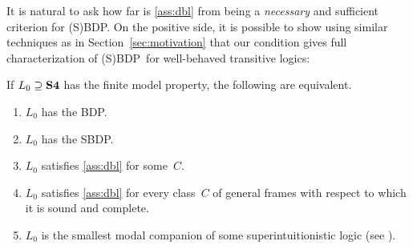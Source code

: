 \documentclass[leqno,draft,11pt]{article}
\def\wbc{BDP}
\def\sbc{SBDP}
\begin{document}
It is natural to ask how far is \th\ref{ass:dbl} from being a
\emph{necessary} and sufficient criterion for (S)\wbc. On the positive
side, it is possible to show using similar techniques as in
Section~\ref{sec:motivation} that our condition gives full
characterization of (S)\wbc\ for well-behaved transitive logics:
\begin{Prop}\th\label{prop:char}
If $L_0\supseteq\mathbf{S4}$ has the finite model property, the following are
equivalent.
\begin{enumerate}
\item $L_0$ has the \wbc.
\item $L_0$ has the \sbc.
\item $L_0$ satisfies \th\ref{ass:dbl} for some~$C$.
\item $L_0$ satisfies \th\ref{ass:dbl} for every class~$C$ of general
frames with respect to which it is sound and complete.
\item $L_0$ is the smallest modal companion of some
superintuitionistic logic (see \cite[\S9.6]{cha-zax}).
\end{enumerate}
\end{Prop}
\end{document}
